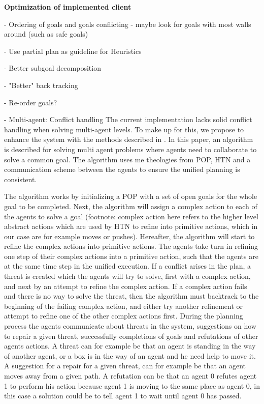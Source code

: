 \documentclass[Main]{subfiles}
\begin{document}
\textbf{Optimization of implemented client}


- Ordering of goals and goals conflicting - maybe look for goals with most walls around (such as safe goals)

- Use partial plan as guideline for Heuristics

- Better subgoal decomposition

- "Better" back tracking

- Re-order goals?

- Multi-agent: Conflict handling
The current implementation lacks solid conflict handling when solving multi-agent levels. To make up for this, we propose to enhance the system with the methods described in \cite{pellier2007unified}. In this paper, an algorithm is described for solving multi agent problems where agents need to collaborate to solve a common goal. The algorithm uses me theologies from POP, HTN and a communication scheme between the agents to ensure the unified planning is consistent.

The algorithm works by initializing a POP with a set of open goals for the whole goal to be completed. Next, the algorithm will assign a complex action to each of the agents to solve a goal (footnote: complex action here refers to the higher level abstract actions which are used by HTN to refine into primitive actions, which in our case are for example moves or pushes). Hereafter, the algorithm will start to refine the complex actions into primitive actions. The agents take turn in refining one step of their complex actions into a primitive action, such that the agents are at the same time step in the unified execution. If a conflict arises in the plan, a threat is created which the agents will try to solve, first with a complex action, and next by an attempt to refine the complex action.
If a complex action fails and there is no way to solve the threat, then the algorithm must backtrack to the beginning of the failing complex action, and either try another refinement or attempt to refine one of the other complex actions first.
During the planning process the agents communicate about threats in the system, suggestions on how to repair a given threat, successfully completions of goals and refutations of other agents actions.
A threat can for example be that an agent is standing in the way of another agent, or a box is in the way of an agent and he need help to move it. A suggestion for a repair for a given threat, can for example be that an agent moves away from a given path. A refutation can be that an agent 0 refutes agent 1 to perform his action because agent 1 is moving to the same place as agent 0, in this case a solution could be to tell agent 1 to wait until agent 0 has passed.
\end{document}
